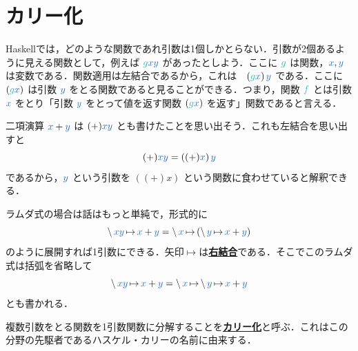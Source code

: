 \documentclass[a5paper,twoside,fleqn,draft]{jsbook}
\def\varColor{NavyBlue}
\def\funcColor{BlueGreen}
\newcommand{\programminglanguage}[1]{\textsf{#1}}
\newcommand{\haskell}{\programminglanguage{Haskell}}
\newcommand{\keyword}[1]{{\underline{\textbf{#1}}}}
\newcommand{\mVar}[1]{\textcolor{\varColor}{#1}}
\newcommand{\mXVar}{\mVar{x}}
\newcommand{\mYVar}{\mVar{y}}
\newcommand{\mFunc}[1]{\textcolor{\funcColor}{#1}}
\newcommand{\mFFunc}{{\mFunc{f}}}
\newcommand{\mGFunc}{\mFunc{g}}
\DeclareMathOperator{\mLambda}{\backslash}
\DeclareMathOperator{\mLambdaArrow}{\mapsto}
\begin{document}
\section{カリー化}

\haskell では，どのような関数であれ引数は1個しかとらない．引数が2個あるように見える関数として，例えば $\mGFunc\mXVar\mYVar$ があったとしよう．ここに $\mGFunc$ は関数，$\mXVar,\mYVar$ は変数である．関数適用は左結合であるから，これは　$\left(\mGFunc\mXVar\right)\mYVar$ である．ここに $\left(\mGFunc\mXVar\right)$ は引数 $\mYVar$ をとる関数であると見ることができる．つまり，関数 $\mFFunc$ とは引数 $\mXVar$ をとり「引数 $\mYVar$ をとって値を返す関数 $\left(\mGFunc\mXVar\right)$ を返す」関数であると言える．

二項演算 $\mXVar+\mYVar$ は $(+)\mXVar\mYVar$ とも書けたことを思い出そう．これも左結合を思い出すと
\begin{equation}
  (+)\mXVar\mYVar
  =\left((+)\mXVar\right)\mYVar
\end{equation}
であるから，$\mYVar$ という引数を $\left((+)x\right)$ という関数に食わせていると解釈できる．

ラムダ式の場合は話はもっと単純で，形式的に
\begin{equation}
  \mLambda\mXVar\mYVar\mLambdaArrow\mXVar+\mYVar
  =\mLambda\mXVar\mLambdaArrow\left(\mLambda\mYVar\mLambdaArrow\mXVar+\mYVar\right)
\end{equation}
のように展開すれば1引数にできる．矢印$\mLambdaArrow$は\keyword{右結合}である．そこでこのラムダ式は括弧を省略して
\begin{equation}
  \mLambda\mXVar\mYVar\mLambdaArrow\mXVar+\mYVar
  =\mLambda\mXVar\mLambdaArrow\mLambda\mYVar\mLambdaArrow\mXVar+\mYVar
\end{equation}
とも書かれる．

複数引数をとる関数を1引数関数に分解することを\keyword{カリー化}と呼ぶ．これはこの分野の先駆者であるハスケル・カリーの名前に由来する．

\end{document}
